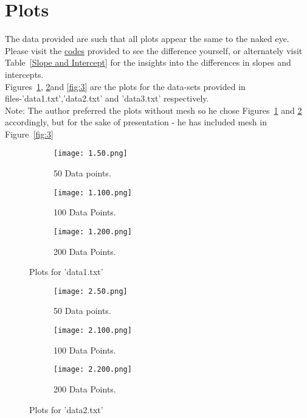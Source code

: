 \documentclass[a4paper, 12pt]{report}
\begin{document}
\section{Plots}
The data provided are such that all plots appear the same to the naked eye. Please visit the \href{https://github.com/YashIITM/Linear-Regression-Using-Octave-and-Python}{codes} provided to see the difference yourself, or alternately visit Table~\ref{Slope and Intercept} for the insights into the differences in slopes and intercepts.\\ Figures~\ref{fig:1}, \ref{fig:2}and \ref{fig:3} are the plots for the data-sets provided in files-'data1.txt','data2.txt' and 'data3.txt' respectively.\\
Note: The author preferred the plots without mesh so he chose Figures~\ref{fig:1} and \ref{fig:2} accordingly, but for the sake of presentation - he has included mesh in Figure~\ref{fig:3}
\begin{figure}
\centering
\begin{subfigure}{.55\textwidth}
  \centering
  \texttt{[image: 1.50.png]}
  \caption{50 Data points.}
\end{subfigure}%
\begin{subfigure}{.55\textwidth}
  \centering
  \texttt{[image: 1.100.png]}
  \caption{100 Data Points.}
\end{subfigure}
\begin{subfigure}{.6\textwidth}
  \centering
  \texttt{[image: 1.200.png]}
  \caption{200 Data Points.}
\end{subfigure}
\caption{Plots for 'data1.txt'}
\label{fig:1}
\end{figure}

\begin{figure}
\centering
\begin{subfigure}{.55\textwidth}
  \centering
  \texttt{[image: 2.50.png]}
  \caption{50 Data points.}
\end{subfigure}%
\begin{subfigure}{.55\textwidth}
  \centering
  \texttt{[image: 2.100.png]}
  \caption{100 Data Points.}
\end{subfigure}
\begin{subfigure}{.6\textwidth}
  \centering
  \texttt{[image: 2.200.png]}
  \caption{200 Data Points.}
\end{subfigure}
\caption{Plots for 'data2.txt'}
\label{fig:2}
\end{figure}
\end{document}
